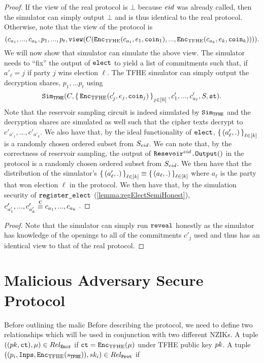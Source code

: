 \begin{lemma}
	\begin{proof}
		If the view of the real protocol is $\bot$ because ${eid}$ was already called, then the simulator can simply output $\bot$
		and is thus identical to the real protocol.
		Otherwise, note that the view of the protocol is
		$$
			(c_{a_1}, ..., c_{a_k}, p_1, ..., p_t, \texttt{view}(C(\texttt{Enc}_{\mathrm{TFHE}}(c_{a_1}, e_1, \texttt{coin}_1), ..., \texttt{Enc}_{\mathrm{TFHE}}(c_{a_k}, e_k, \texttt{coin}_k) ))).
		$$
		We will now show that simulator can simulate the above view.
		The simulator needs to ``fix'' the output of $\texttt{elect}$ to yield
		a list of commitments such that, if $a'_\ell = j$ if party $j$ wins election $\ell$.
		The TFHE simulator can simply output the decryption shares, $p_1, ... p_t$ using
		$$\texttt{Sim}_{{\texttt{TFHE}}}(C, \set{\texttt{Enc}_{\mathrm{TFHE}}(c'_j, e_j, \texttt{coin}_j)}_{j \in [\overline{n}]}, c'_1, ..., c'_{a_\ell}, S, \texttt{st}).$$
		Note that the reservoir sampling circuit is indeed simulated by $\texttt{Sim}_{{\texttt{TFHE}}}$
		and the decryption shares are simulated as well such that the cipher texts decrypt
		to $c'_{a'_1}, ..., c'_{a'_k}$.
		We also have that, by the ideal functionality of $\texttt{elect}$, $\set{(a'_\ell, .)}_{\ell \in [k]}$ is a randomly chosen
		ordered subset from $S_{eid}$. We can note that, by the correctness of reservoir sampling,
		the output of $\texttt{Resevoir}^{{eid}}\texttt{.Output}()$ in the protocol is a randomly chosen ordered subset from $S_{eid}$.
		We then have that the distribution of the simulator's $\set{(a'_\ell, .)}_{\ell \in [k]} \equiv \set{(a_\ell, .)}_{\ell \in [k]}$
		where $a_\ell$ is the party that won election $\ell$ in the protocol.
		We then have that, by the simulation security of $\texttt{register\_elect}$ (\cref{lemma:regElectSemiHonest}), $c'_{a'_1}, ..., c'_{a'_k} \compInd c_{a_1}, ..., c_{a_k}$ .
	\end{proof}
\end{lemma}

\begin{lemma}
	\begin{proof}
		Note that the simulator can simply run $\texttt{reveal}$ honestly as the simulator has knowledge of the openings to all of the commitments $c'_j$ used
		and thus has an identical view to that of the real protocol.
	\end{proof}
\end{lemma}

\section{Malicious Adversary Secure Protocol}
\newcommand{\relEncr}{\proofRel_\texttt{Encr}}
\newcommand{\relProt}{\proofRel_\texttt{Prot}}
Before outlining the malic
\newcommand{\inCTList}{\texttt{Inps}}
\newcommand{\decryptShares}{\texttt{Shares}}
Before describing the protocol, we need to define two relationships which will be used in
conjunction with two different NZIKs. A tuple $((\TFHEPk, \ct), \mu) \in \relEncr$ if
$\texttt{ct} = \texttt{Enc}_{\mathrm{TFHE}}(\mu)$ under TFHE public key $pk$.
A tuple $((p_i, \inCTList, \Enc(s_\TFHE)), \TFHESk_i) \in \relProt$ if

